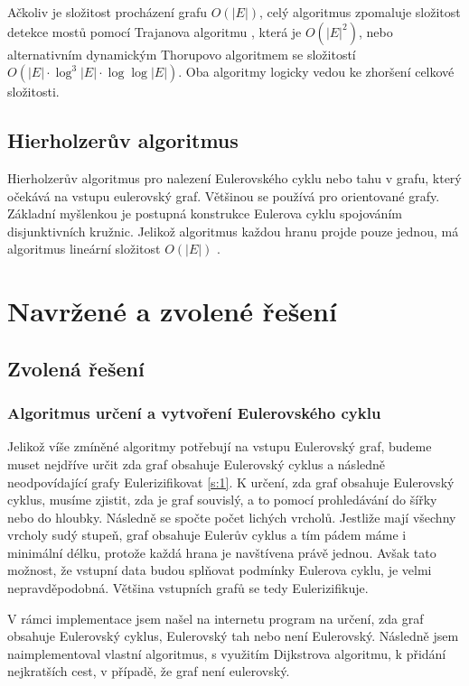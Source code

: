 \documentclass[12pt, a4paper]{article}
\begin{document}
Ačkoliv je složitost procházení grafu $O(|E|)$, celý algoritmus zpomaluje složitost detekce mostů pomocí Trajanova algoritmu \cite{Tarjan}, která je $O(|E|^2)$, nebo alternativním dynamickým Thorupovo algoritmem \cite{Thorup} se složitostí \newline \noindent $O(|E| \cdot \log^3 |E| \cdot \log \log |E|)$. Oba algoritmy logicky vedou ke zhoršení celkové složitosti.

\subsection{Hierholzerův algoritmus}
Hierholzerův algoritmus \cite{Eulerian, Hierholzer} pro nalezení Eulerovského cyklu nebo tahu v grafu, který očekává na vstupu eulerovský graf. Většinou se používá pro orientované grafy. Základní myšlenkou je postupná konstrukce Eulerova cyklu spojováním disjunktivních kružnic. Jelikož algoritmus každou hranu projde pouze jednou, má algoritmus lineární složitost $O(|E|)$ .

\section{Navržené a zvolené řešení}
\label{s:2}
\subsection{Zvolená řešení}

\subsubsection{Algoritmus určení a vytvoření Eulerovského cyklu}
Jelikož víše zmíněné algoritmy potřebují na vstupu Eulerovský graf, budeme muset nejdříve určit zda graf obsahuje Eulerovský cyklus a následně neodpovídající grafy Eulerizifikovat \ref{s:1}. K určení, zda graf obsahuje Eulerovský cyklus, musíme zjistit, zda je graf souvislý, a to pomocí prohledávání do šířky nebo do hloubky. Následně se spočte počet lichých vrcholů. Jestliže mají všechny vrcholy sudý stupeň, graf obsahuje Eulerův cyklus a tím pádem máme i minimální délku, protože každá hrana je navštívena právě jednou. Avšak tato možnost, že vstupní data budou splňovat podmínky Eulerova cyklu, je velmi nepravděpodobná. Většina vstupních grafů se tedy Eulerizifikuje. 

V rámci implementace jsem našel na internetu program \cite{Geeks} na určení, zda graf obsahuje Eulerovský cyklus, Eulerovský tah nebo není Eulerovský. Následně jsem naimplementoval vlastní algoritmus, s využitím Dijkstrova algoritmu, k přidání nejkratších cest, v případě, že graf není eulerovský.
\end{document}
